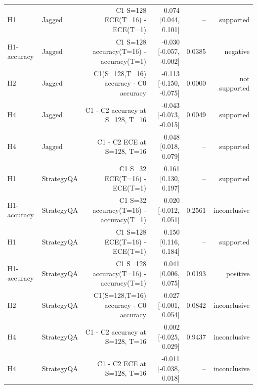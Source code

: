 \begin{table}[h!]
{\begin{tabular}{llrrrr}
H1 & Jagged & C1 S=128 ECE(T=16) - ECE(T=1) & 0.074 [0.044, 0.101] & -- & supported \\
H1-accuracy & Jagged & C1 S=128 accuracy(T=16) - accuracy(T=1) & -0.030 [-0.057, -0.002] & 0.0385 & negative \\
H2 & Jagged & C1(S=128,T=16) accuracy - C0 accuracy & -0.113 [-0.150, -0.075] & 0.0000 & not supported \\
H4 & Jagged & C1 - C2 accuracy at S=128, T=16 & -0.043 [-0.073, -0.015] & 0.0049 & supported \\
H4 & Jagged & C1 - C2 ECE at S=128, T=16 & 0.048 [0.018, 0.079] & -- & supported \\
H1 & StrategyQA & C1 S=32 ECE(T=16) - ECE(T=1) & 0.161 [0.130, 0.197] & -- & supported \\
H1-accuracy & StrategyQA & C1 S=32 accuracy(T=16) - accuracy(T=1) & 0.020 [-0.012, 0.051] & 0.2561 & inconclusive \\
H1 & StrategyQA & C1 S=128 ECE(T=16) - ECE(T=1) & 0.150 [0.116, 0.184] & -- & supported \\
H1-accuracy & StrategyQA & C1 S=128 accuracy(T=16) - accuracy(T=1) & 0.041 [0.006, 0.075] & 0.0193 & positive \\
H2 & StrategyQA & C1(S=128,T=16) accuracy - C0 accuracy & 0.027 [-0.001, 0.054] & 0.0842 & inconclusive \\
H4 & StrategyQA & C1 - C2 accuracy at S=128, T=16 & 0.002 [-0.025, 0.029] & 0.9437 & inconclusive \\
H4 & StrategyQA & C1 - C2 ECE at S=128, T=16 & -0.011 [-0.038, 0.018] & -- & inconclusive \\
\bottomrule
\end{tabular}}
\end{table}
